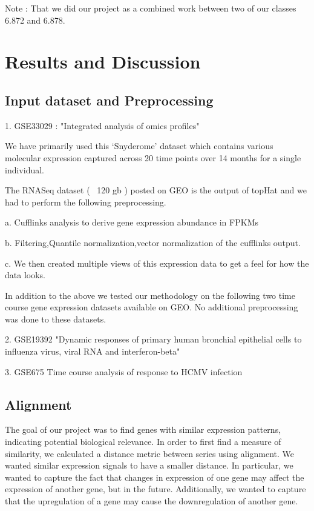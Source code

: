 \documentclass[aps,prd,final,onecolumn,a4paper,10pt]{revtex4}
\begin{document}
  Note : That we did our project as a combined work between two of our classes 6.872 and 6.878.

\section{Results and Discussion}
\subsection{Input dataset and Preprocessing}
\begin{description}
 \item 1. GSE33029 : "Integrated analysis of omics profiles"
 
 We have primarily used this ‘Snyderome’ dataset which contains various molecular expression captured across 20 time points over 14 months for a single individual.

The RNASeq dataset ( ~120 gb ) posted on GEO is the output of topHat and we had to perform the following preprocessing.
\begin{description}
 \item a. Cufflinks analysis to derive gene expression abundance in FPKMs
 \item b. Filtering,Quantile normalization,vector normalization of the cufflinks output.
 \item c. We then created multiple views of this expression data to get a feel for how the
		data looks.
\end{description}


In addition to the above we tested our methodology on the following two time course gene expression datasets available on GEO. No additional preprocessing was done to these datasets.

 \item 2. GSE19392 "Dynamic responses of primary human bronchial epithelial cells to influenza virus, viral RNA and interferon-beta"
 \item 3. GSE675 Time course analysis of response to HCMV infection
\end{description}


\subsection{Alignment}

The goal of our project was to find genes with similar expression patterns, indicating potential biological relevance.
In order to first find a measure of similarity, we calculated a distance metric between series using alignment.
We wanted similar expression signals to have a smaller distance. In particular, we wanted to capture the fact that changes in expression of one gene may affect the expression of another gene, but in the future. Additionally, we wanted to capture that the upregulation of a gene may cause the downregulation of another gene.
\\
\end{document}
